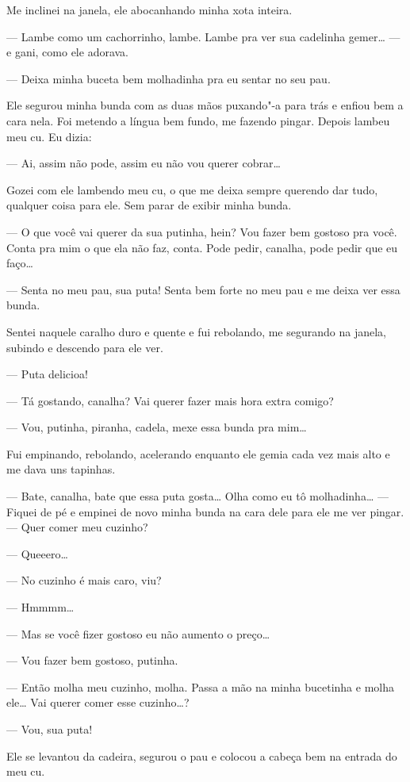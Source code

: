 Me inclinei na janela, ele abocanhando minha xota inteira.

--- Lambe como um cachorrinho, lambe. Lambe pra ver sua cadelinha
gemer… --- e gani, como ele adorava.

--- Deixa minha buceta bem molhadinha pra eu sentar no seu pau.

Ele segurou minha bunda com as duas mãos puxando"-a para trás e enfiou
bem a cara nela. Foi metendo a língua bem fundo, me fazendo pingar.
Depois lambeu meu cu. Eu dizia:

--- Ai, assim não pode, assim eu não vou querer cobrar…

Gozei com ele lambendo meu cu, o que me deixa sempre querendo dar tudo,
qualquer coisa para ele. Sem parar de exibir minha bunda.

--- O que você vai querer da sua putinha, hein? Vou fazer bem gostoso
pra você. Conta pra mim o que ela não faz, conta. Pode pedir, canalha,
pode pedir que eu faço…

--- Senta no meu pau, sua puta! Senta bem forte no meu pau e me deixa
ver essa bunda.

Sentei naquele caralho duro e quente e fui rebolando, me segurando na
janela, subindo e descendo para ele ver.

--- Puta delicioa!

--- Tá gostando, canalha? Vai querer fazer mais hora extra comigo?

--- Vou, putinha, piranha, cadela, mexe essa bunda pra mim…

Fui empinando, rebolando, acelerando enquanto ele gemia cada vez mais
alto e me dava uns tapinhas.

--- Bate, canalha, bate que essa puta gosta… Olha como eu tô
molhadinha… --- Fiquei de pé e empinei de novo minha bunda na
cara dele para ele me ver pingar. --- Quer comer meu cuzinho?

--- Queeero…

--- No cuzinho é mais caro, viu?

--- Hmmmm…

--- Mas se você fizer gostoso eu não aumento o preço…

--- Vou fazer bem gostoso, putinha.

--- Então molha meu cuzinho, molha. Passa a mão na minha bucetinha e
molha ele… Vai querer comer esse cuzinho…?

--- Vou, sua puta!

Ele se levantou da cadeira, segurou o pau e colocou a cabeça bem na
entrada do meu cu.

